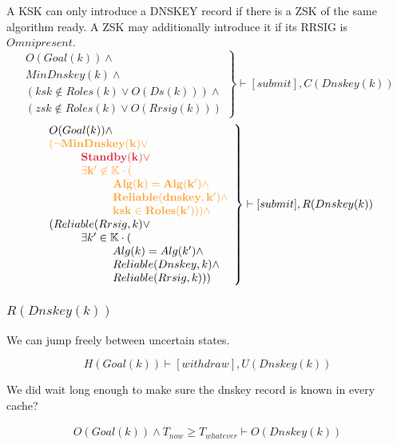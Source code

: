 \documentclass[twoside, a4paper]{article}
\newcommand{\highlightMinSig}[1]{\textcolor{MinSig}{\bf{#1}}}
\newcommand{\highlightStandby}[1]{\textcolor{Stdby}{\bf{#1}}}
\newcommand{\mathbox}[1]{#1}
\begin{document}
\mathbox{

	A KSK can only introduce a DNSKEY record if there is a ZSK of the
	same algorithm ready. A ZSK may additionally introduce it if its 
	RRSIG is $Omnipresent$.
\highlightMinSig{
	\begin{equation}
		\left.
		\begin{array}{l}
			O(Goal(k)) \wedge \\
			MinDnskey(k) \wedge \\
			(ksk \not \in Roles(k) \vee O(Ds(k))) \wedge \\
			(zsk \not \in Roles(k) \vee O(Rrsig(k)))
		\end{array}
		\right\} \vdash [submit], C(Dnskey(k))
	\end{equation}
}
	\begin{equation}
		\left.
		\begin{array}{l}
			O(Goal(k)) \wedge \\
\highlightMinSig{			(\neg MinDnskey(k) \vee}\\
\highlightStandby{\hskip 1cm	Standby(k) \vee }\\
\highlightMinSig{\hskip 1cm \exists k' \not \in \mathbb{K} \cdot (}\\
\highlightMinSig{\hskip 2cm	Alg(k)=Alg(k') \wedge}\\
\highlightMinSig{\hskip 2cm	Reliable(dnskey, k') \wedge }\\
\highlightMinSig{\hskip 2cm	ksk \in Roles(k'))) \wedge }\\
\hskip 0cm	(Reliable(Rrsig, k) \vee \\
\hskip 1cm	\exists k' \in \mathbb{K} \cdot ( \\
\hskip 2cm		Alg(k)=Alg(k') \wedge \\
\hskip 2cm		Reliable(Dnskey, k) \wedge \\
\hskip 2cm		Reliable(Rrsig, k)))\\
		\end{array}
		\right\} \vdash [submit], R(Dnskey(k))
	\end{equation}
}

\subsubsection{$R(Dnskey(k))$}

\mathbox{

	We can jump freely between uncertain states.
	
	\begin{equation}
			H(Goal(k)) \vdash [withdraw], U(Dnskey(k))
	\end{equation}

	We did wait long enough to make sure the dnskey record is known in 
	every cache?
	
	\begin{equation}
		\begin{split}
			O(Goal(k)) \wedge T_{now} \geq T_{whatever} \vdash O(Dnskey(k))
		\end{split}
	\end{equation}
}
\end{document}
